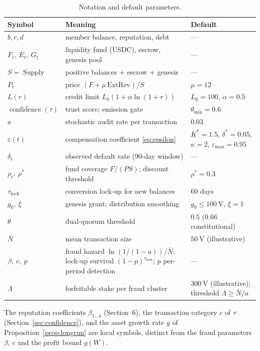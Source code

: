 \documentclass[11pt]{article}
\theoremstyle{plain}
\theoremstyle{definition}
\theoremstyle{remark}
\newcommand{\V}{\mathrm{V}}
\newcommand{\confidence}{\operatorname{confidence}}
\newcommand{\Supply}{\operatorname{Supply}}
\newcommand{\ExtRev}{\mathrm{ExtRev}}
\begin{document}
\begin{table}[h]
\centering
\small
\begin{tabular}{@{}lll@{}}
\toprule
Symbol & Meaning & Default\\
\midrule
$b,r,d$ & member balance, reputation, debt & ---\\
$F_t,\ E_t,\ G_t$ & liquidity fund (USDC), escrow, genesis pool & ---\\
$S=\Supply$ & positive balances $+$ escrow $+$ genesis & ---\\
$P_t$ & price $(F+\mu\,\ExtRev)/S$ & $\mu=12$\\
$L(r)$ & credit limit $L_0(1+\alpha\ln(1+r))$ & $L_0=100$, $\alpha=0.5$\\
$\confidence(\tau)$ & trust score; emission gate & $\theta_{\min}=0.6$\\
$a$ & stochastic audit rate per transaction & $0.03$\\
$\varepsilon(t)$ & compensation coefficient \eqref{eq:epsilon} & $K^*{=}1.5$, $\delta^*{=}0.05$, $\kappa{=}2$, $\varepsilon_{\max}{=}0.95$\\
$\delta_t$ & observed default rate ($90$-day window) & ---\\
$\rho_t,\ \rho^*$ & fund coverage $F/(PS)$; discount threshold & $\rho^*=0.3$\\
$\tau_{\mathrm{lock}}$ & conversion lock-up for new balances & $60$ days\\
$g_0,\ \xi$ & genesis grant; distribution smoothing & $g_0\le100~\V$, $\xi=1$\\
$\theta$ & dual-quorum threshold & $0.5$ ($0.66$ constitutional)\\
$\bar N$ & mean transaction size & $50~\V$ (illustrative)\\
$\beta,\ c,\ p$ & fraud hazard $\ln(1/(1-a))/\bar N$; lock-up survival $(1-p)^{\tau_{\mathrm{lock}}}$; $p$ per-period detection & ---\\
$\Lambda$ & forfeitable stake per fraud cluster & $300~\V$ (illustrative); threshold $\Lambda\ge\bar N/a$\\
\bottomrule
\end{tabular}
\caption{Notation and default parameters.}
\label{tab:notation}
\end{table}

The reputation coefficients $\beta_{1\ldots4}$ (Section~6), the transaction category $c$ of $\tau$ (Section~\ref{sec:confidence}), and the asset growth rate $g$ of Proposition~\ref{prop:longrun} are local symbols, distinct from the fraud parameters $\beta$, $c$ and the profit bound $g(W)$.
\end{document}
